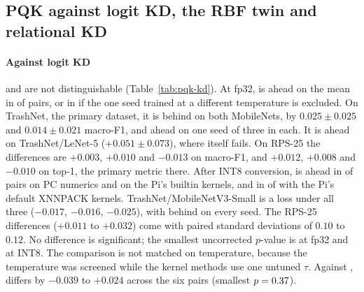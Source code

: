 \subsection{PQK against logit KD, the RBF twin and relational KD}
\label{sec:results-pqk}

\begin{table}[t]
  \centering
  \caption{Paired difference $\mathtt{pqk}-\mathtt{kd}$ in test macro-F1 (mean $\pm$ std of the per-seed differences, and the seeds on which \Pqk is ahead). \Pqk is at its validation-selected $\lambda$ at fp32 and at the exported variant at INT8; these differ only for TrashNet/MobileNetV2-0.35 ($\lambda=1$ at INT8). ``PC'' uses LiteRT's builtin kernels on x86; the ``Pi'' columns were measured on the Raspberry Pi with its builtin kernels and with its default XNNPACK delegate. $^{\P}$See Table~\ref{tab:main}. LeNet-5 was not exported.}
  \label{tab:pqk-kd}
\end{table}

\paragraph{Against logit KD}
\Pqk and \Kd are not distinguishable (Table~\ref{tab:pqk-kd}).
At fp32, \Pqk is ahead on the mean in \KdAheadFp{} of \NPairs{} pairs, or in \KdAheadFpEx{} if the one \Kd seed trained at a different temperature is excluded.
On TrashNet, the primary dataset, it is behind on both MobileNets, by $0.025\pm0.025$ and $0.014\pm0.021$ macro-F1, and ahead on one seed of three in each.
It is ahead on TrashNet/LeNet-5 ($+0.051\pm0.073$), where \Kd itself fails. On RPS-25 the differences are $+0.003$, $+0.010$ and $-0.013$ on macro-F1, and $+0.012$, $+0.008$ and $-0.010$ on top-1, the primary metric there.
After INT8 conversion, \Pqk is ahead in \KdAheadPc{} of \NExported{} pairs on PC numerics and on the Pi's builtin kernels, and in \KdAheadXnn{} of \NExported{} with the Pi's default XNNPACK kernels.
TrashNet/MobileNetV3-Small is a loss under all three ($-0.017$, $-0.016$, $-0.025$), with \Pqk behind on every seed. The RPS-25 differences ($+0.011$ to $+0.032$) come with paired standard deviations of $0.10$ to $0.12$.
No difference is significant; the smallest uncorrected $p$-value is \MinPKd{} at fp32 and \MinPKdInt{} at INT8.
The comparison is not matched on temperature, because the \Kd temperature was screened while the kernel methods use one untuned $\tau$.
Against \Scratch, \Pqk differs by $-0.039$ to $+0.024$ across the six pairs (smallest $p=0.37{}$).

